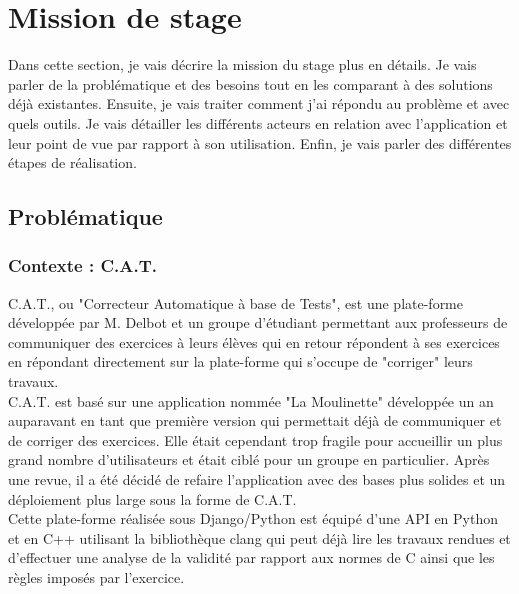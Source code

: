 \titleformat{\chapter}[display]
  {\normalfont\bfseries}{}{0pt}{\Large}

\chapter{Mission de stage}

Dans cette section, je vais décrire la mission du stage plus en détails. Je vais parler de la problématique et des besoins tout en les comparant à des solutions déjà existantes. Ensuite, je vais traiter comment j'ai répondu au problème et avec quels outils. Je vais détailler les différents acteurs en relation avec l'application et leur point de vue par rapport à son utilisation. Enfin, je vais parler des différentes étapes de réalisation.\\

\section{Problématique}

\subsection{Contexte : C.A.T.}

C.A.T., ou "Correcteur Automatique à base de Tests", est une plate-forme développée par M. Delbot et un groupe d'étudiant permettant aux professeurs de communiquer des exercices à leurs élèves qui en retour répondent à ses exercices en répondant directement sur la plate-forme qui s'occupe de "corriger" leurs travaux.\\

C.A.T. est basé sur une application nommée "La Moulinette" développée un an auparavant en tant que première version qui permettait déjà de communiquer et de corriger des exercices. Elle était cependant trop fragile pour accueillir un plus grand nombre d'utilisateurs et était ciblé pour un groupe en particulier. Après une revue, il a été décidé de refaire l'application avec des bases plus solides et un déploiement plus large sous la forme de C.A.T.\\

Cette plate-forme réalisée sous Django/Python est équipé d'une API en Python et en C++ utilisant la bibliothèque clang qui peut déjà lire les travaux rendues et d'effectuer une analyse de la validité par rapport aux normes de C ainsi que les règles imposés par l'exercice.\\

